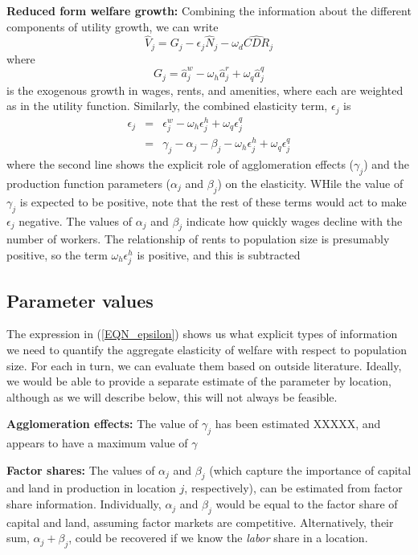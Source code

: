 \documentclass[10pt]{article}
\begin{document}
\textbf{Reduced form welfare growth:} Combining the information about the different components of utility growth, we can write
\begin{equation}
    \hat{V}_j = G_j - \epsilon_j \hat{N}_j - \omega_d \hat{CDR}_j
\end{equation}
where 
\begin{equation}
    G_j = \hat{a}^w_j - \omega_h \hat{a}^r_j + \omega_q \hat{a}^q_j
\end{equation}
is the exogenous growth in wages, rents, and amenities, where each are weighted as in the utility function. Similarly, the combined elasticity term, $\epsilon_j$ is
\begin{eqnarray}
    \epsilon_j &=& \epsilon^w_j - \omega_h \epsilon^h_j + \omega_q \epsilon^q_j \\
               &=& \gamma_j - \alpha_j - \beta_j - \omega_h \epsilon^h_j + \omega_q \epsilon^q_j \label{EQN_epsilon}
\end{eqnarray}
where the second line shows the explicit role of agglomeration effects ($\gamma_j$) and the production function parameters ($\alpha_j$ and $\beta_j$) on the elasticity. WHile the value of $\gamma_j$ is expected to be positive, note that the rest of these terms would act to make $\epsilon_j$ negative. The values of $\alpha_j$ and $\beta_j$ indicate how quickly wages decline with the number of workers. The relationship of rents to population size is presumably positive, so the term $\omega_h \epsilon^h_j$ is positive, and this is subtracted

\subsection{Parameter values}
The expression in (\ref{EQN_epsilon}) shows us what explicit types of information we need to quantify the aggregate elasticity of welfare with respect to population size. For each in turn, we can evaluate them based on outside literature. Ideally, we would be able to provide a separate estimate of the parameter by location, although as we will describe below, this will not always be feasible.

\textbf{Agglomeration effects:} The value of $\gamma_j$ has been estimated XXXXX, and appears to have a maximum value of $\gamma$

\textbf{Factor shares:} The values of $\alpha_j$ and $\beta_j$ (which capture the importance of capital and land in production in location $j$, respectively), can be estimated from factor share information. Individually, $\alpha_j$ and $\beta_j$ would be equal to the factor share of capital and land, assuming factor markets are competitive. Alternatively, their sum, $\alpha_j + \beta_j$, could be recovered if we know the \textit{labor} share in a location. 
\end{document}
